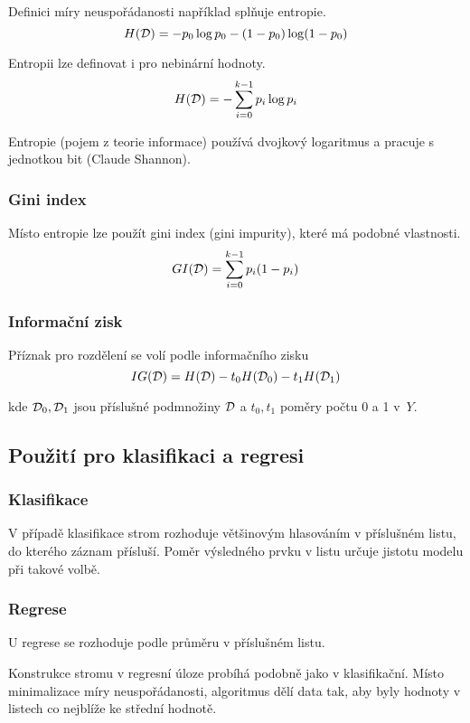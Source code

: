 Definici míry neuspořádanosti například splňuje entropie.
\[
    H(\mathcal{D}) = -p_0 \log p_0 - (1-p_0) \log (1-p_0)
\]

Entropii lze definovat i pro nebinární hodnoty.
\[
    H(\mathcal{D}) = - \sum_{i=0}^{k-1} p_i \log p_i
\]

Entropie (pojem z teorie informace) používá dvojkový logaritmus a pracuje s jednotkou bit (Claude Shannon).

\subsubsection{Gini index}

Místo entropie lze použít gini index (gini impurity), které má podobné vlastnosti.
\[
    GI(\mathcal{D}) = \sum_{i=0}^{k-1} p_i (1 - p_i)
\]

\subsubsection{Informační zisk}

Příznak pro rozdělení se volí podle informačního zisku
\[
    IG(\mathcal{D}) = H(\mathcal{D}) - t_0 H(\mathcal{D}_0) - t_1 H(\mathcal{D}_1)
\]

kde $\mathcal{D}_0, \mathcal{D}_1$ jsou příslušné podmnožiny $\mathcal{D}$ a $t_0, t_1$ poměry počtu 0 a 1 v~$Y$.

\subsection{Použití pro klasifikaci a regresi}

\subsubsection{Klasifikace}

V případě klasifikace strom rozhoduje většinovým hlasováním v příslušném listu, do kterého záznam přísluší. Poměr výsledného prvku v listu určuje jistotu modelu při takové volbě.

\subsubsection{Regrese}

U regrese se rozhoduje podle průměru v příslušném listu.

Konstrukce stromu v regresní úloze probíhá podobně jako v klasifikační. Místo minimalizace míry neuspořádanosti, algoritmus dělí data tak, aby byly hodnoty v listech co nejblíže ke střední hodnotě.

